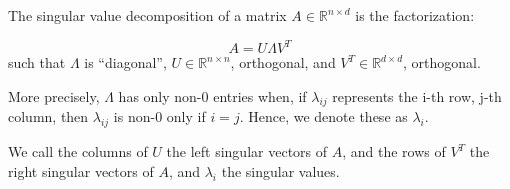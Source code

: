 \documentclass[10pt]{article}
\begin{document}
The singular value decomposition of a matrix $A \in \mathbb{R}^{n \times d}$ is the factorization:

$$ A = U \Lambda V^T$$ such that $\Lambda$ is “diagonal”, $U \in \mathbb{R}^{n \times n}$, orthogonal, and $V^T \in \mathbb{R}^{d \times d}$, orthogonal.

More precisely, $\Lambda$ has only non-0 entries when, if $\lambda_{ij}$ represents the i-th row, j-th column, then $\lambda_{ij}$ is non-0 only if $i = j$. Hence, we denote these as $\lambda_i$.  

We call the columns of $U$ the left singular vectors of $A$, and the rows of $V^T$ the right singular vectors of $A$, and $\lambda_i$ the singular values.
\end{document}
